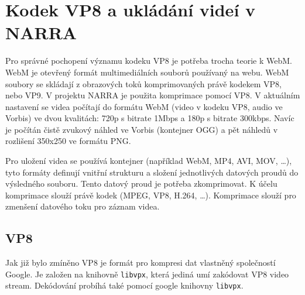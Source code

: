 
\section {Kodek VP8 a ukládání videí v NARRA}
\par Pro správné pochopení významu kodeku VP8\cite{vp8} je potřeba trocha teorie k WebM\cite{webm}. WebM je otevřený formát multimediálních souborů používaný na webu. WebM soubory se skládají z obrazových toků komprimovaných právě kodekem VP8, nebo VP9. V projektu NARRA je použita komprimace pomocí VP8. V aktuálním nastavení se videa počítají do formátu WebM (video v kodeku VP8, audio ve Vorbis) ve dvou kvalitách: 720p s bitrate 1Mbps a 180p s bitrate 300kbps. Navíc je počítán čistě zvukový náhled ve Vorbis (kontejner OGG) a pět náhledů v rozlišení 350x250 ve formátu PNG. 
\par Pro uložení videa se používá kontejner (například WebM, MP4, AVI, MOV, \ldots), tyto formáty definují vnitřní strukturu a složení jednotlivých datových proudů do výsledného souboru. Tento datový proud je potřeba zkomprimovat. K účelu komprimace slouží právě kodek (MPEG, VP8, H.264, \ldots). Komprimace slouží pro zmenšení datového toku pro záznam videa.
\subsection{VP8}
\par Jak již bylo zmíněno VP8 je formát pro kompresi dat vlastněný společností Google. Je založen na knihovně \texttt{libvpx}, která jediná umí zakódovat VP8 video stream. Dekódování probíhá také pomocí google knihovny \texttt{libvpx}.